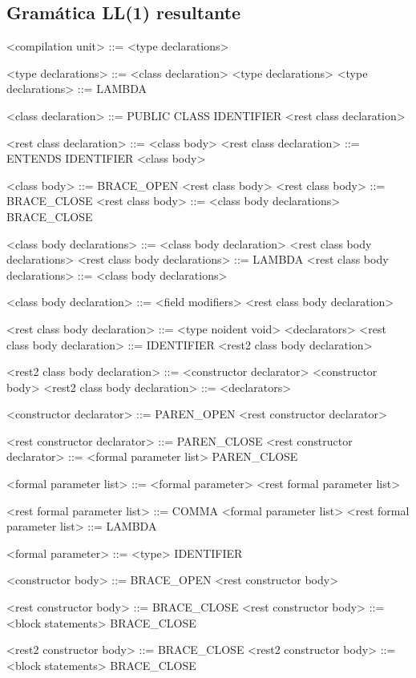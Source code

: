 \subsection{Gramática LL(1) resultante}
<compilation unit>             ::= <type declarations>

<type declarations>            ::= <class declaration> <type declarations>
<type declarations>            ::= LAMBDA

<class declaration>            ::= PUBLIC CLASS IDENTIFIER <rest class declaration>

<rest class declaration>       ::= <class body>
<rest class declaration>       ::= ENTENDS IDENTIFIER <class body>

<class body>                   ::= BRACE_OPEN <rest class body>
<rest class body>              ::= BRACE_CLOSE
<rest class body>              ::= <class body declarations> BRACE_CLOSE

<class body declarations>      ::= <class body declaration> <rest class body declarations>
<rest class body declarations> ::= LAMBDA
<rest class body declarations> ::= <class body declarations>

<class body declaration>       ::= <field modifiers> <rest class body declaration>

<rest class body declaration>  ::= <type noident void> <declarators>
<rest class body declaration>  ::= IDENTIFIER <rest2 class body declaration>

<rest2 class body declaration> ::= <constructor declarator> <constructor body>
<rest2 class body declaration> ::= <declarators>

<constructor declarator>       ::= PAREN_OPEN <rest constructor declarator>

<rest constructor declarator>  ::= PAREN_CLOSE
<rest constructor declarator>  ::= <formal parameter list> PAREN_CLOSE

<formal parameter list>        ::= <formal parameter> <rest formal parameter list>

<rest formal parameter list>   ::= COMMA <formal parameter list>
<rest formal parameter list>   ::= LAMBDA

<formal parameter>             ::= <type> IDENTIFIER

<constructor body>             ::= BRACE_OPEN <rest constructor body>

<rest constructor body>        ::= BRACE_CLOSE
<rest constructor body>        ::= <block statements> BRACE_CLOSE

<rest2 constructor body>       ::= BRACE_CLOSE
<rest2 constructor body>       ::= <block statements> BRACE_CLOSE

